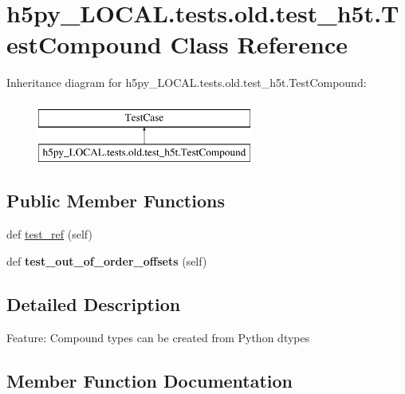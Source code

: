 \hypertarget{classh5py__LOCAL_1_1tests_1_1old_1_1test__h5t_1_1TestCompound}{}\section{h5py\+\_\+\+L\+O\+C\+A\+L.\+tests.\+old.\+test\+\_\+h5t.\+Test\+Compound Class Reference}
\label{classh5py__LOCAL_1_1tests_1_1old_1_1test__h5t_1_1TestCompound}
Inheritance diagram for h5py\+\_\+\+L\+O\+C\+A\+L.\+tests.\+old.\+test\+\_\+h5t.\+Test\+Compound\+:\begin{figure}[H]
\begin{center}
\leavevmode
\includegraphics[height=2.000000cm]{classh5py__LOCAL_1_1tests_1_1old_1_1test__h5t_1_1TestCompound}
\end{center}
\end{figure}
\subsection*{Public Member Functions}
\begin{DoxyCompactItemize}
\item 
def \hyperlink{classh5py__LOCAL_1_1tests_1_1old_1_1test__h5t_1_1TestCompound_a270d282e47a4a0cfc96a9ad5209bb74e}{test\+\_\+ref} (self)
\item 
\mbox{\label{classh5py__LOCAL_1_1tests_1_1old_1_1test__h5t_1_1TestCompound_a484cdc483dc095e78dc2bd41c37c6f3b}} 
def {\bfseries test\+\_\+out\+\_\+of\+\_\+order\+\_\+offsets} (self)
\end{DoxyCompactItemize}


\subsection{Detailed Description}
\begin{DoxyVerb}    Feature: Compound types can be created from Python dtypes
\end{DoxyVerb}
 

\subsection{Member Function Documentation}
\mbox{\label{classh5py__LOCAL_1_1tests_1_1old_1_1test__h5t_1_1TestCompound_a270d282e47a4a0cfc96a9ad5209bb74e}} 
